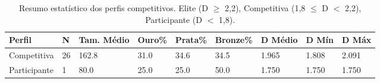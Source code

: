 \begin{table}[htbp]
\centering
\caption{Resumo estatístico dos perfis competitivos. Elite (D $\geq$ 2,2), Competitiva (1,8 $\leq$ D $<$ 2,2), Participante (D $<$ 1,8).}
\label{tab:profiles_summary}
\begin{tabular}{lllllllll}
\hline
Perfil & N & Tam. Médio & Ouro\% & Prata\% & Bronze\% & D Médio & D Mín & D Máx \\
\hline
Competitiva & 26 & 162.8 & 31.0 & 34.6 & 34.5 & 1.965 & 1.808 & 2.091 \\
Participante & 1 & 80.0 & 25.0 & 25.0 & 50.0 & 1.750 & 1.750 & 1.750 \\
\hline
\end{tabular}
\end{table}

